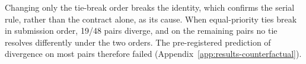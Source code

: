 Changing only the tie-break order breaks the identity, which confirms the serial rule, rather than the contract alone, as its cause. When equal-priority ties break in submission order, 19/48 pairs diverge, and on the remaining pairs no tie resolves differently under the two orders. The pre-registered prediction of divergence on most pairs therefore failed (Appendix~\ref{app:results-counterfactual}).

